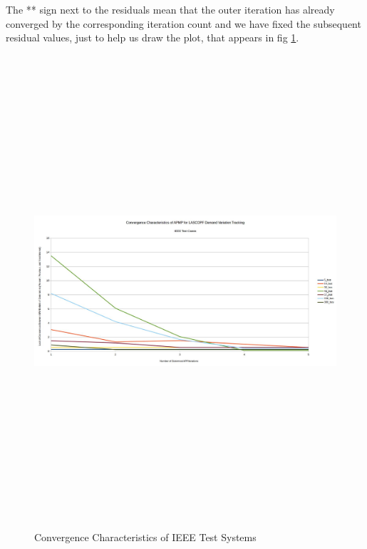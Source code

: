\documentclass[preprint,12pt,3p]{elsarticle}
\begin{document}
The ** sign next to the residuals mean that the outer iteration has already converged by the corresponding iteration count and we have fixed the subsequent residual values, just to help us draw the plot, that appears in fig \ref{SummaryConv}. 
\begin{figure}
\begin{center}
\includegraphics[height=17.5cm,width=21cm, angle=90]{N-1_SCOPF_Summary_Improved.jpg} %
\caption{Convergence Characteristics of IEEE Test Systems}
\label{SummaryConv}
\end{center}
\end{figure}
\end{document}
